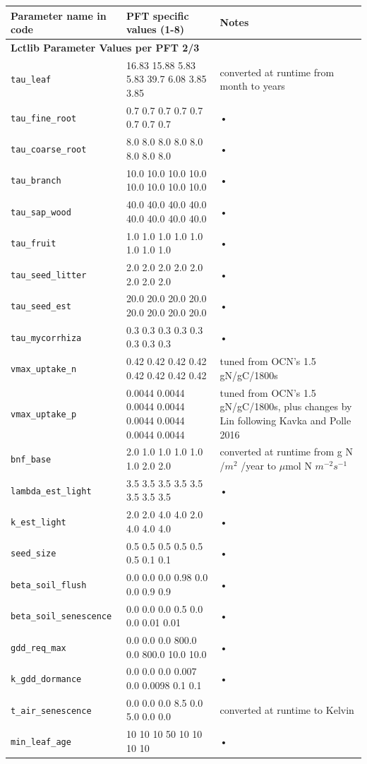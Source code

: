 \begin{table}
\begin{tabularx}{\linewidth}{|l|l|X|} %
\hline 
Parameter name in code & PFT specific values (1-8) & Notes \\ 
\hline 

\multicolumn{3}{l}{\bf Lctlib Parameter Values per PFT 2/3}\\
\hline
\texttt{tau\_leaf} & 16.83 15.88 5.83 5.83 39.7 6.08 3.85 3.85 & converted at runtime from month to years \\
\texttt{tau\_fine\_root} & 0.7 0.7 0.7 0.7 0.7 0.7 0.7 0.7 & • \\
\texttt{tau\_coarse\_root} & 8.0 8.0 8.0 8.0 8.0 8.0 8.0 8.0 & • \\
\texttt{tau\_branch} & 10.0 10.0 10.0 10.0 10.0 10.0 10.0 10.0 & • \\
\texttt{tau\_sap\_wood} & 40.0 40.0 40.0 40.0 40.0 40.0 40.0 40.0 & • \\
\texttt{tau\_fruit} & 1.0 1.0 1.0 1.0 1.0 1.0 1.0 1.0 & • \\
\texttt{tau\_seed\_litter} & 2.0 2.0 2.0 2.0 2.0 2.0 2.0 2.0 & • \\
\texttt{tau\_seed\_est} & 20.0 20.0 20.0 20.0 20.0 20.0 20.0 20.0 & • \\
\texttt{tau\_mycorrhiza} & 0.3 0.3 0.3 0.3 0.3 0.3 0.3 0.3 & • \\
\texttt{vmax\_uptake\_n} & 0.42 0.42 0.42 0.42 0.42 0.42 0.42 0.42 & tuned from OCN's 1.5 gN/gC/1800s \\
\texttt{vmax\_uptake\_p} & 0.0044 0.0044 0.0044 0.0044 0.0044 0.0044 0.0044 0.0044 & tuned from OCN's 1.5 gN/gC/1800s, plus changes by Lin following Kavka and Polle 2016 \\
\texttt{bnf\_base} & 2.0 1.0 1.0 1.0 1.0 1.0 2.0 2.0 & converted at runtime from g N /$m^2$ /year to $\mu$mol N $m^{-2} s^{-1}$ \\
\texttt{lambda\_est\_light} & 3.5 3.5 3.5 3.5 3.5 3.5 3.5 3.5 & • \\
\texttt{k\_est\_light} & 2.0 2.0 4.0 4.0 2.0 4.0 4.0 4.0 & • \\
\texttt{seed\_size} & 0.5 0.5 0.5 0.5 0.5 0.5 0.1 0.1 & • \\
\texttt{beta\_soil\_flush} & 0.0 0.0 0.0 0.98 0.0 0.0 0.9 0.9 & • \\
\texttt{beta\_soil\_senescence} & 0.0 0.0 0.0 0.5 0.0 0.0 0.01 0.01 & • \\
\texttt{gdd\_req\_max} & 0.0 0.0 0.0 800.0 0.0 800.0 10.0 10.0 & • \\
\texttt{k\_gdd\_dormance} & 0.0 0.0 0.0 0.007 0.0 0.0098 0.1 0.1 & • \\
\texttt{t\_air\_senescence} & 0.0 0.0 0.0 8.5 0.0 5.0 0.0 0.0 & converted at runtime to Kelvin \\
\texttt{min\_leaf\_age} & 10 10 10 50 10 10 10 10 & • \\

\hline 
\end{tabularx}
\end{table}

